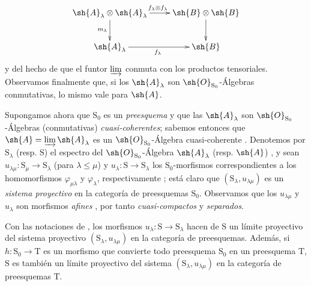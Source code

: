 \begin{env}[8.2.1]
\[
\xymatrix{
  \sh{A}_\lambda\otimes\sh{A}_\lambda \ar[r]^{f_\lambda\otimes f_\lambda} \ar[d]_{m_\lambda} & \sh{B}\otimes\sh{B} \ar[d] \\
  \sh{A}_\lambda \ar[r]_{f_\lambda} & \sh{B}
}
\]
y del hecho de que el funtor $\varinjlim$ conmuta con los productos tensoriales.
Observamos finalmente que, si los $\sh{A}_\lambda$ son $\sh{O}_{\mathrm{S}_0}$-Álgebras conmutativas, lo mismo vale para $\sh{A}$.
\end{env}

\begin{env}[8.2.2]
\label{IV.8.2.2}
Supongamos ahora que $\mathrm{S}_0$ es un \emph{preesquema} y que las $\sh{A}_\lambda$ son $\sh{O}_{\mathrm{S}_0}$-Álgebras (conmutativas) \emph{cuasi-coherentes}; sabemos entonces que $\sh{A}=\varinjlim\sh{A}_\lambda$ es un $\sh{O}_{\mathrm{S}_0}$-Álgebra cuasi-coherente .
Denotemos por $\mathrm{S}_\lambda$ (resp. $\mathrm{S}$) el espectro del $\sh{O}_{\mathrm{S}_0}$-Álgebra $\sh{A}_\lambda$ (resp. $\sh{A}$) , y sean $u_{\lambda\mu}:\mathrm{S}_\mu\to\mathrm{S}_\lambda$ (para $\lambda\leqslant\mu$) y $u_\lambda:\mathrm{S}\to\mathrm{S}_\lambda$ los $\mathrm{S}_0$-morfismos correspondientes a los homomorfismos $\varphi_{\mu\lambda}$ y $\varphi_\lambda$, respectivamente ; está claro que $(\mathrm{S}_\lambda,u_{\lambda\mu})$ es un \emph{sistema proyectivo} en la categoría de preesquemas $\mathrm{S}_0$.
Observamos que los $u_{\lambda\mu}$ y $u_\lambda$ son morfismos \emph{afines} , por tanto \emph{cuasi-compactos} y \emph{separados}.
\end{env}

\begin{proposition}[8.2.3]
\label{IV.8.2.3}
Con las notaciones de , los morfismos $u_\lambda:\mathrm{S}\to\mathrm{S}_\lambda$ hacen de $\mathrm{S}$ un límite proyectivo del sistema proyectivo $(\mathrm{S}_\lambda,u_{\lambda\mu})$ en la categoría de preesquemas.
Además, si $h:\mathrm{S}_0\to\mathrm{T}$ es un morfismo que convierte todo preesquema $\mathrm{S}_0$ en un preesquema $\mathrm{T}$, $\mathrm{S}$ es también un límite proyectivo del sistema $(\mathrm{S}_\lambda,u_{\lambda\mu})$ en la categoría de preesquemas $\mathrm{T}$.
\end{proposition}

